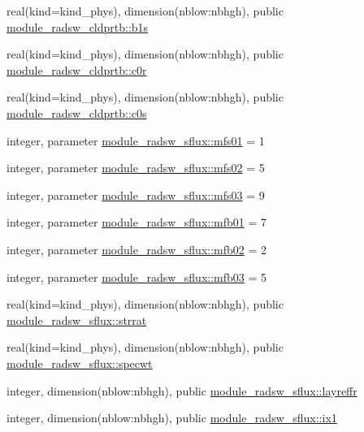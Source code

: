 \begin{DoxyCompactItemize}
\item 
real(kind=kind\+\_\+phys), dimension(nblow\+:nbhgh), public \hyperlink{namespacemodule__radsw__cldprtb_a2d2296e76fb85b66bd4583bcb9fa271b}{module\+\_\+radsw\+\_\+cldprtb\+::b1s}
\item 
real(kind=kind\+\_\+phys), dimension(nblow\+:nbhgh), public \hyperlink{namespacemodule__radsw__cldprtb_a8927b6e7cc810301e3843eb0f5c0c795}{module\+\_\+radsw\+\_\+cldprtb\+::c0r}
\item 
real(kind=kind\+\_\+phys), dimension(nblow\+:nbhgh), public \hyperlink{namespacemodule__radsw__cldprtb_aab7693c5f31ce2182bca61aff77996bc}{module\+\_\+radsw\+\_\+cldprtb\+::c0s}
\item 
integer, parameter \hyperlink{namespacemodule__radsw__sflux_aba08e6f9d4dccd130e87300e6fd0ed58}{module\+\_\+radsw\+\_\+sflux\+::mfs01} = 1
\item 
integer, parameter \hyperlink{namespacemodule__radsw__sflux_acca3bbc0dd125a3e8c3734c58c48e79b}{module\+\_\+radsw\+\_\+sflux\+::mfs02} = 5
\item 
integer, parameter \hyperlink{namespacemodule__radsw__sflux_a5bd55a5106ce82bd47250d38d9b8f22a}{module\+\_\+radsw\+\_\+sflux\+::mfs03} = 9
\item 
integer, parameter \hyperlink{namespacemodule__radsw__sflux_a08a0f1278962ac27634169ea7632bc70}{module\+\_\+radsw\+\_\+sflux\+::mfb01} = 7
\item 
integer, parameter \hyperlink{namespacemodule__radsw__sflux_afdf71cabed6ae0076d98ff0e563dbc61}{module\+\_\+radsw\+\_\+sflux\+::mfb02} = 2
\item 
integer, parameter \hyperlink{namespacemodule__radsw__sflux_a2e3b510d781c596fa0bb9b1359a988dd}{module\+\_\+radsw\+\_\+sflux\+::mfb03} = 5
\item 
real(kind=kind\+\_\+phys), dimension(nblow\+:nbhgh), public \hyperlink{namespacemodule__radsw__sflux_aee2a2275da028b0960c5c1c8a34f46cf}{module\+\_\+radsw\+\_\+sflux\+::strrat}
\item 
real(kind=kind\+\_\+phys), dimension(nblow\+:nbhgh), public \hyperlink{namespacemodule__radsw__sflux_a7d1a386e92555bcb09239ab098d8b398}{module\+\_\+radsw\+\_\+sflux\+::specwt}
\item 
integer, dimension(nblow\+:nbhgh), public \hyperlink{namespacemodule__radsw__sflux_a90c56da1bcadbea0b42e12487c1c1eec}{module\+\_\+radsw\+\_\+sflux\+::layreffr}
\item 
integer, dimension(nblow\+:nbhgh), public \hyperlink{namespacemodule__radsw__sflux_ac2864b4501e9bc3804d45d14f4aab472}{module\+\_\+radsw\+\_\+sflux\+::ix1}

\end{DoxyCompactItemize}
